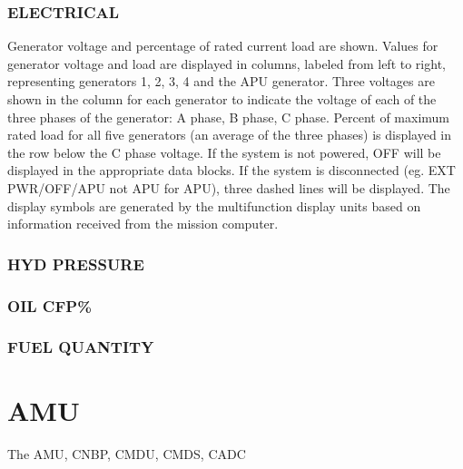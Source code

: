 \subsection*{ELECTRICAL}
Generator voltage and percentage of rated current load are shown. Values for generator voltage and load are displayed in columns, labeled from left to right, representing generators 1, 2, 3, 4 and the APU generator. Three voltages are shown in the column for each generator to indicate the voltage of each of the three phases of the generator: A phase, B phase, C phase. Percent of maximum rated load for all five generators (an average of the three phases) is displayed in the row below the C phase voltage. If the system is not powered, OFF will be displayed in the appropriate data blocks. If the system is disconnected (eg. EXT PWR/OFF/APU not APU for APU), three dashed lines will be displayed. The display symbols are generated by the multifunction display units based on information received from the mission computer. 

\subsection*{HYD PRESSURE}

\subsection*{OIL CFP\%}

\subsection*{FUEL QUANTITY}

\chapter{AMU}
\label{chap:amu}

The \gls{AMU}, \gls{CNBP}, \gls{CMDU}, \gls{CMDS}, \gls{CADC}
